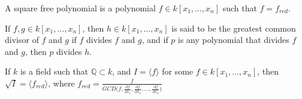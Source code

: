 \documentclass[crop=false,class=book]{standalone}
\begin{document}
\begin{definition}
A square free polynomial is a polynomial $f\in k[x_1,\hdots ,x_n]$ such that $f = f_{red}$.
\end{definition}
\begin{definition}
If $f,g\in k[x_1,\hdots ,x_n]$, then $h\in k[x_1,\hdots ,x_n]$ is said to be the greatest common divisor of $f$ and $g$ if $f$ divides $f$ and $g$, and if $p$ is any polynomial that divides $f$ and $g$, then $p$ divides $h$.
\end{definition}
\begin{theorem}
If $k$ is a field such that $\mathbb{Q} \subset k$, and $I = \langle f\rangle$ for some $f\in k[x_1,\hdots ,x_n]$, then $\sqrt{I} = \langle f_{red}\rangle$, where $f_{red} = \frac{f}{GCD\big(f, \frac{\partial f}{\partial x_1}, \frac{\partial f}{\partial x_2}, \hdots, \frac{\partial f}{\partial x_n}\big)}$
\end{theorem}
\end{document}
